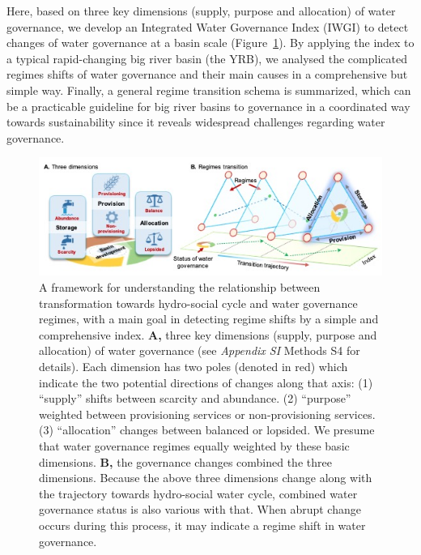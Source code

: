 \documentclass[9pt, twocolumn, twoside, lineno]{pnas-new}
\begin{document}
\label{introduction-section-3}
Here, based on three key dimensions (supply, purpose and allocation) of water governance, we develop an Integrated Water Governance Index (IWGI) to detect changes of water governance at a basin scale (Figure~\ref{fig:framework}).
By applying the index to a typical rapid-changing big river basin (the YRB), we analysed the complicated regimes shifts of water governance and their main causes in a comprehensive but simple way.
Finally, a general regime transition schema is summarized, which can be a practicable guideline for big river basins to governance in a coordinated way towards sustainability since it reveals widespread challenges regarding water governance.


\begin{figure}%
	\centering
	\includegraphics[width=0.8\linewidth]{../../figures/main/framework.jpg}
	\caption{
		A framework for understanding the relationship between transformation towards hydro-social cycle and water governance regimes, with a main goal in detecting regime shifts by a simple and comprehensive index.
		\textbf{A,} three key dimensions (supply, purpose and allocation) of water governance (see \textit{Appendix SI} Methods S4 for details). Each dimension has two poles (denoted in red) which indicate the two potential directions of changes along that axis: (1) ``supply'' shifts between scarcity and abundance. (2) ``purpose'' weighted between provisioning services or non-provisioning services. (3) ``allocation'' changes between balanced or lopsided. We presume that water governance regimes equally weighted by these basic dimensions. 
		\textbf{B,} the governance changes combined the three dimensions. Because the above three dimensions change along with the trajectory towards hydro-social water cycle, combined water governance status is also various with that. When abrupt change occurs during this process, it may indicate a regime shift in water governance.
	}
	\label{fig:framework}
\end{figure}
\end{document}
